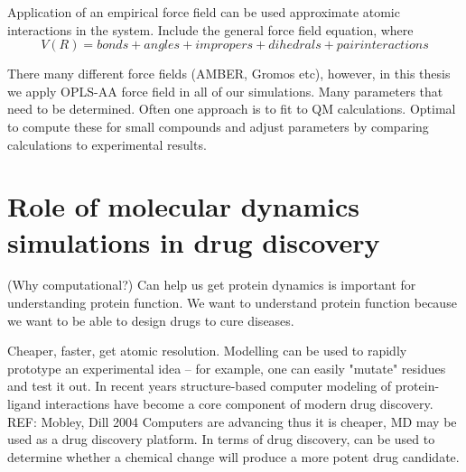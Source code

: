 

  \2 Application of an empirical force field can be used approximate atomic interactions in the system.
      \3 Include the general force field equation, where
      \[ V(R) = bonds + angles + impropers + dihedrals + pair interactions \]

      \3 There many different force fields (AMBER, Gromos etc), however, in this thesis we apply OPLS-AA force field in all of our simulations.
        \4 Many parameters that need to be determined. Often one approach is to fit to QM calculations.  Optimal to compute these for small compounds and adjust parameters by comparing calculations to experimental results.


\section{Role of molecular dynamics simulations in drug discovery}
\1 (Why computational?) Can help us get protein dynamics is important for understanding protein function. We want to understand protein function because we want to be able to design drugs to cure diseases.

\1 Cheaper, faster, get atomic resolution. Modelling can be used to rapidly prototype an experimental idea -- for example, one can easily "mutate" residues and test it out. In recent years structure-based computer modeling of protein-ligand interactions have become a core component of modern drug discovery. REF: Mobley, Dill 2004 Computers are advancing thus it is cheaper, MD may be used as a drug discovery platform. In terms of drug discovery, can be used to determine whether a chemical change will produce a more potent drug candidate.

